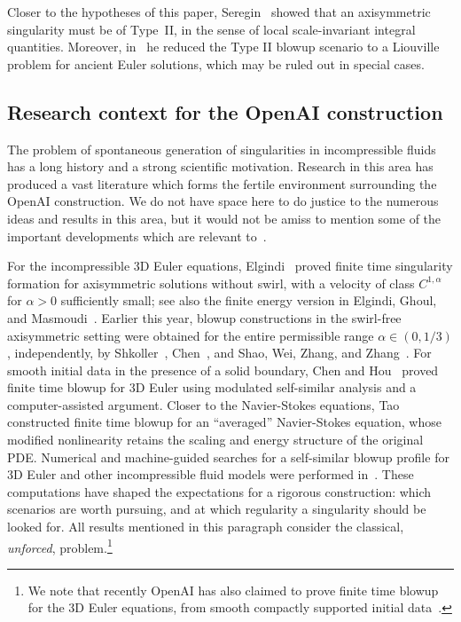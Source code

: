 \documentclass[11pt,reqno]{amsproc}
\numberwithin{equation}{section}
\theoremstyle{remark}
\begin{document}
Closer to the hypotheses of this paper, Seregin~\cite{Seregin20} showed that an axisymmetric singularity must be of Type~II, in the sense of local scale-invariant integral quantities. Moreover, in~\cite{Seregin23,Seregin24,Seregin25,Seregin26} he reduced the Type II blowup scenario to a Liouville problem for ancient Euler solutions, which may be ruled out in special cases.

\subsection{Research context for the OpenAI construction}
\label{sec:aniso:builds}
The problem of spontaneous generation of singularities in incompressible fluids has a long history and a strong scientific motivation. Research in this area has produced a vast literature which forms the fertile environment surrounding the OpenAI construction. We do not have space here to do justice to the numerous ideas and results in this area, but it would not be amiss to mention some of the important developments which are
relevant to~\cite{OpenAIManuscript}.

For the incompressible 3D Euler equations, Elgindi~\cite{Elgindi21} proved finite time singularity formation for axisymmetric solutions without swirl, with a velocity of class $C^{1,\alpha}$ for $\alpha>0$ sufficiently small; see also the finite energy version in Elgindi, Ghoul, and Masmoudi~\cite{EGM21}. Earlier this year, blowup constructions in the swirl-free axisymmetric setting were obtained for the entire permissible range $\alpha\in(0,1/3)$, independently, by Shkoller~\cite{Shkoller26},  Chen~\cite{Chen26a,Chen26b}, and Shao, Wei, Zhang, and Zhang~\cite{SWZZ26}. For smooth initial data in the presence of a solid boundary, Chen and Hou~\cite{ChenHouPNAS25} proved finite time blowup for 3D Euler using modulated self-similar analysis and a computer-assisted argument. Closer to the Navier-Stokes equations, Tao~\cite{Tao16} constructed finite time blowup for an ``averaged'' Navier-Stokes equation,  whose modified nonlinearity retains the scaling and energy structure of the original PDE. Numerical and machine-guided searches for a self-similar  blowup profile for 3D Euler and other incompressible fluid models were performed in~\cite{HouHuang22,Hou23,WLGB23,WangEtAl25,GDA26,DGGA26}. These computations have shaped the expectations for a rigorous construction: which scenarios are worth pursuing, and at which regularity a singularity should be looked for.
All results mentioned in this paragraph consider the classical, \emph{unforced}, problem.\footnote{We note that recently OpenAI has also claimed to prove finite time blowup for the 3D Euler equations, from smooth compactly supported initial data~\cite{OpenAIEuler}.}
\end{document}
